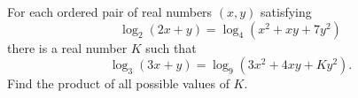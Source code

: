 For each ordered pair of real numbers $(x,y)$ satisfying
\[ \log_2(2x+y) = \log_4(x^2+xy+7y^2) \]there is a real number $K$ such that
\[ \log_3(3x+y) = \log_9(3x^2+4xy+Ky^2). \]Find the product of all possible values of $K$.